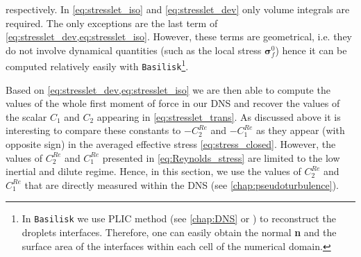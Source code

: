 respectively. 
In \ref{eq:stresslet_iso} and \ref{eq:stresslet_dev} only volume integrals are required.
The only exceptions are the last term of \ref{eq:stresslet_dev,eq:stresslet_iso}.
However, these terms are geometrical, i.e. they do not involve dynamical quantities (such as the local stress $\bm\sigma_f^0$) hence it can be computed relatively easily with \texttt{Basilisk}\footnote{In \texttt{Basilisk} we use PLIC method (see \ref{chap:DNS} or \citet{tryggvason2011direct}) to reconstruct the droplets interfaces. 
Therefore, one can easily obtain the normal \textbf{n} and the surface area of the interfaces within each cell of the numerical domain.}.



Based on \ref{eq:stresslet_dev,eq:stresslet_iso} we are then able to compute the values of the whole first moment of force in our DNS and recover the values of the scalar $C_1$ and $C_2$ appearing in \ref{eq:stresslet_trans}. 
As discussed above it is interesting to compare these constants to $- C_2^{Re}$ and $-C_1^{Re}$ as they appear (with opposite sign) in the averaged effective stress \eqref{eq:stress_closed}. 
However, the values of $C_2^{Re}$ and $C_1^{Re}$ presented in \ref{eq:Reynolds_stress} are limited to the low inertial and dilute regime. 
Hence, in this section, we use the values of $C_2^{Re}$ and $C_1^{Re}$ that are directly measured within the DNS (see \ref{chap:pseudoturbulence}). 

